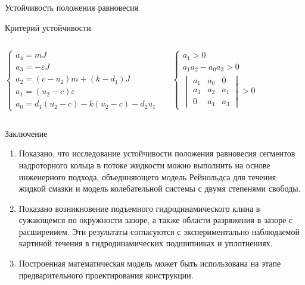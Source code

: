 \documentclass[ignoreonframetext,unicode]{beamer}
\begin{document}
\begin{frame}{Устойчивость положения равновесия}
\begin{block}{Критерий устойчивости}
\begin{columns}
	\begin{equation*} 
		\begin{cases}
			a_4 = m J \\
			a_3 = - \varepsilon J \\
			a_2 = \left(c - u_2 \right) m + \left(k - d_1 \right)J \\
			a_1 = \left(u_2 - c\right) \varepsilon \\
			a_0 = d_1 \left( u_2 - c \right) - k \left( u_2 - c \right) - d_2 u_1
		\end{cases}
	\end{equation*}

		\begin{equation*} 
		\begin{cases}
			a_1 >  0 \\
			a_1 a_2 - a_0 a_3 > 0 \\
			\begin{vmatrix*}
				a_1 & a_0 & 0 \\
				a_3 & a_2 & a_1 \\
				0 & a_4 & a_3 
			\end{vmatrix*} > 0
		\end{cases}
	\end{equation*}
\end{columns}
\end{block}


	
\end{frame}

\begin{frame}{Заключение}
	\begin{block}{}
	\begin{enumerate}	
		\item Показано, что исследование устойчивости положения равновесия сегментов надроторного кольца в потоке жидкости можно выполнить на основе инженерного подхода, объединяющего модель Рейнольдса для течения жидкой смазки и модель колебательной системы с двумя степенями свободы.
		\item Показано возникновение подъемного гидродинамического клина в сужающемся по окружности зазоре, а также области разряжения в зазоре с расширением. Эти результаты согласуются с экспериментально наблюдаемой картиной течения в гидродинамических подшипниках и уплотнениях.
		\item Построенная математическая модель может быть использована на этапе предварительного проектирования конструкции.
	\end{enumerate}
	\end{block}	

\end{frame}	
\end{document}
